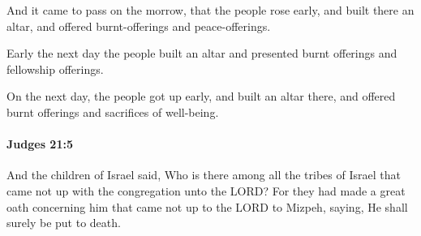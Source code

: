 			\begin{versebox}
					\item[BHS] 
					\item[ASV] And it came to pass on the morrow, that the people rose early, and built there an altar, and offered burnt-offerings and peace-offerings.
					\item[NIV] Early the next day the people built an altar and presented burnt offerings and fellowship offerings.
					\item[NRSV] On the next day, the people got up early, and built an altar there, and offered burnt offerings and sacrifices of well-being.
			\end{versebox}

		\paragraph{Judges 21:5} %
			\label{JUDGES-21-5}

			And the children of Israel said, Who is there among all the tribes of Israel that came not up with the congregation unto the LORD? For they had made a great oath concerning him that came not up to the LORD to Mizpeh, saying, He shall surely be put to death.

